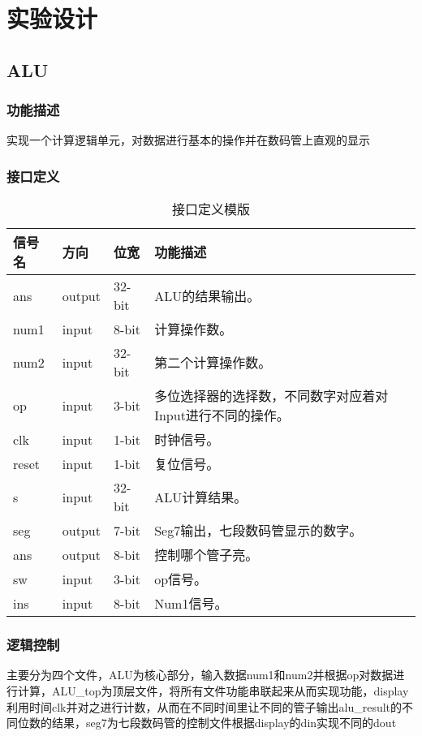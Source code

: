 \section{实验设计}
\subsection{ALU}\label{sub:alu}
\subsubsection{功能描述}
实现一个计算逻辑单元，对数据进行基本的操作并在数码管上直观的显示
\subsubsection{接口定义}
\begin{table}[htp]
	\caption{接口定义模版}\label{tab:signaldef1}
	\begin{center}
		\begin{tabular}{|l|l|l|p{6cm}|}
		\hline
		\textbf{信号名} & \textbf{方向} & \textbf{位宽} & \textbf{功能描述}\\ \hline \hline
		ans		& output	& 32-bit	& ALU的结果输出。\\ \hline
		num1	& input		& 8-bit		& 计算操作数。\\ \hline
		num2	& input		& 32-bit	& 第二个计算操作数。\\ \hline
		op		& input		& 3-bit		& 多位选择器的选择数，不同数字对应着对Input进行不同的操作。\\ \hline
		clk		& input		& 1-bit		& 时钟信号。\\ \hline
		reset	& input		& 1-bit		& 复位信号。\\ \hline
		s		& input		& 32-bit	& ALU计算结果。\\ \hline
		seg		& output	& 7-bit		& Seg7输出，七段数码管显示的数字。\\ \hline
		ans		& output	& 8-bit		& 控制哪个管子亮。\\ \hline
		sw		& input		& 3-bit		& op信号。\\ \hline
		ins		& input		& 8-bit		& Num1信号。\\ \hline
		\end{tabular}
	\end{center}
\end{table}		

\subsubsection{逻辑控制}
主要分为四个文件，ALU为核心部分，输入数据num1和num2并根据op对数据进行计算，ALU\_top为顶层文件，将所有文件功能串联起来从而实现功能，display利用时间clk并对之进行计数，从而在不同时间里让不同的管子输出alu\_result的不同位数的结果，seg7为七段数码管的控制文件根据display的din实现不同的dout
